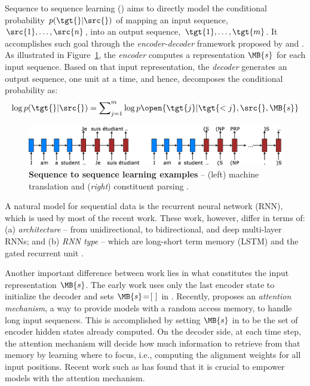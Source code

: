Sequence to sequence learning (\ssl{}) aims to directly model the conditional
probability $p(\tgt{}|\src{})$ of mapping an input sequence,
$\src{1},\ldots,\src{n}$, into an output sequence, $\tgt{1},\ldots,\tgt{m}$.
It accomplishes such goal through the {\it encoder-decoder} framework proposed
by \citet{sutskever14} and \citet{cho14}. As illustrated in Figure~\ref{f:s2s},
the {\it encoder} computes a representation $\MB{s}$
for each input sequence. Based on that input representation,
the {\it decoder} generates an output sequence, one unit at a time, and hence, decomposes the conditional probability as:
\begin{equation}
\log p(\tgt{}|\src{}) = \sum_{j=1}^m \nolimits \log
p\open{\tgt{j}|\tgt{<j},\src{},\MB{s}}
\label{e:s2s}
\end{equation}


\begin{figure}%
\centering
\includegraphics[width=1\textwidth, clip=true, trim= 0 0 0
0]{img/6-1_seq2seq}
\caption[Sequence to sequence learning examples]{{\bf Sequence to sequence learning examples} -- (left) machine
translation \citep{sutskever14} and ({\it right}) constituent parsing
\citep{vinyals15grammar}.}
\label{f:s2s}
\end{figure}

A natural model for sequential data is the recurrent
neural network (RNN), which is used by most of the recent \ssl{} work.
These work,
however, differ in terms of: (a) {\it architecture} -- from unidirectional, to
bidirectional, and deep multi-layer RNNs; and (b) {\it RNN type} -- which are long-short term memory (LSTM)
\citep{lstm97} and the gated recurrent unit \citep{cho14}. 

Another important difference between \ssl{} work lies in what constitutes the
input representation $\MB{s}$.
The early \ssl{} work \citep{sutskever14,cho14,luong15,vinyals15caption} uses only the last encoder state
 to initialize the decoder and sets $\MB{s}\!=\![\text{ }]$ in %
. Recently, \citet{bog15} proposes an {\it attention mechanism}, a way
to provide \ssl{} models with a random access memory, to 
handle long input sequences.
This is accomplished by setting
$\MB{s}$ in  to be the set of encoder hidden states already computed. On the decoder side, at each time step, the attention mechanism will
decide how much information to retrieve from that memory by learning where to
focus, i.e., computing the alignment weights for all input positions. Recent work such as \citep{xu15,jean15,luong15attn,vinyals15grammar}
has found that it is crucial to empower \ssl{} models with the attention mechanism.

